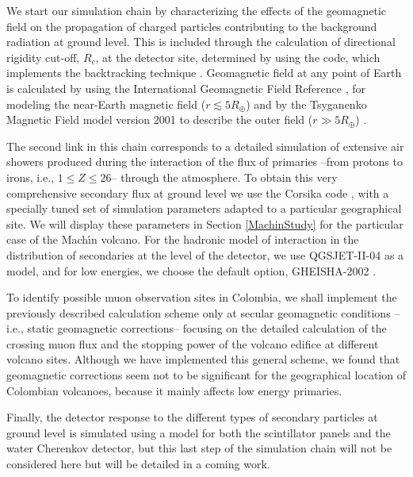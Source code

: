 \documentclass[letterpaper,10pt,titlepage,linenumber]{article}
\begin{document}
We start our simulation chain by characterizing the effects of the geomagnetic field on the propagation of charged particles contributing to the background radiation at ground level. This is included through the calculation of directional rigidity cut-off, $R_c$, at the detector site, determined by using the {} code, which implements the backtracking technique \cite{Desorgher2003,MasiasDasso2014}. Geomagnetic field  at any point of Earth is calculated by using the International Geomagnetic Field Reference \cite{IGRF11}, for modeling the near-Earth magnetic field ($r\lesssim5 R_{\oplus}$) and by the Tsyganenko Magnetic Field model version 2001  to describe the outer field ($r \gg 5 R_{\oplus}$) \cite{Tsyganenko2002}. 

The second link in this chain corresponds to a detailed simulation of extensive air showers produced during the interaction of the flux of primaries --from protons to irons, i.e., $1\leq Z \leq 26$-- through the atmosphere.  To obtain this very comprehensive secondary flux at ground level we use the {\sc Corsika} code \cite{HeckEtal1998}, with a specially tuned set of simulation parameters adapted to a particular geographical site. We will display these parameters in Section \ref{MachinStudy} for the particular case of the Mach\'{\i}n volcano.  For the hadronic model of interaction in the distribution of secondaries at the level of the detector, we use  QGSJET-II-04\cite{Ostapchenko2011} as a model, and for low energies, we choose the default option, GHEISHA-2002 \cite{Fesefeldt1985}.

To identify possible muon observation sites in Colombia, we shall implement the previously described calculation scheme only at secular geomagnetic conditions --i.e., static geomagnetic corrections-- focusing on the detailed calculation of the crossing muon flux and the stopping power of the volcano edifice at different volcano sites. Although we have implemented this general scheme, we found that geomagnetic corrections seem not to be significant for the geographical location of Colombian volcanoes, because it mainly affects low energy primaries\cite{AsoreyNunezSuarez2018}. 

Finally, the detector response to the different types of secondary particles at ground level is simulated using a {} model \cite{AgostinelliEtal2003, CalderonAsoreyNunez2015} for both the scintillator panels and the water Cherenkov detector, but this last step of the simulation chain will not be considered here but will be detailed in a coming  work\cite{JaimesMottaENG2018,VasquezramirezENG2019,VasquezEtal2019,PenarodriguezEtal2020prep}.
\end{document}
